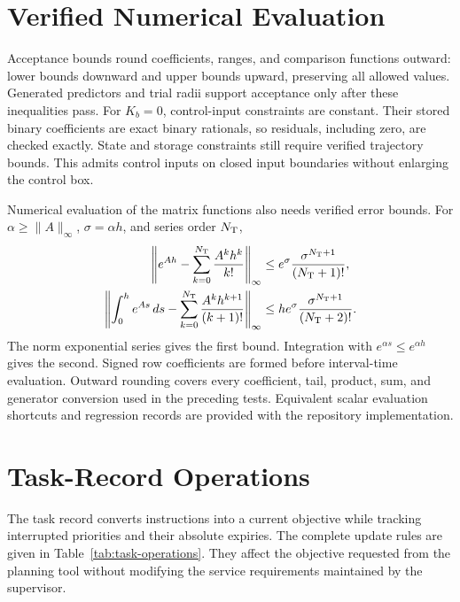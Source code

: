 \documentclass[preprint,12pt]{elsarticle}
\theoremstyle{definition}
\theoremstyle{plain}
\theoremstyle{definition}
\theoremstyle{plain}
\begin{document}
\section{Verified Numerical Evaluation}
\label{app:verified-arithmetic}

Acceptance bounds round coefficients, ranges, and comparison functions
outward: lower bounds downward and upper bounds upward, preserving all
allowed values. Generated predictors and trial radii support acceptance
only after these inequalities pass. For $K_b=0$, control-input constraints
are constant. Their stored binary coefficients are exact binary rationals,
so residuals, including zero, are checked exactly. State and storage
constraints still require verified trajectory bounds. This admits control inputs
on closed input boundaries without enlarging the control box.

Numerical evaluation of the matrix functions also needs verified error
bounds. For $\alpha\ge\|A\|_\infty$, $\sigma=\alpha h$, and series order $N_{\rm T}$,
\begin{equation}
 \begin{aligned}
 \left\|e^{Ah}-\sum_{k=0}^{N_{\rm T}}\frac{A^kh^k}{k!}\right\|_\infty
       &\le e^\sigma\frac{\sigma^{N_{\rm T}+1}}{(N_{\rm T}+1)!},\\
 \left\|\int_0^h e^{As}\,ds-
          \sum_{k=0}^{N_{\rm T}}\frac{A^kh^{k+1}}{(k+1)!}\right\|_\infty
       &\le he^\sigma\frac{\sigma^{N_{\rm T}+1}}{(N_{\rm T}+2)!}.
 \end{aligned}
 \label{eq:structure-matrix-tails}
\end{equation}
The norm exponential series gives the first bound. Integration with
$e^{\alpha s}\le e^{\alpha h}$ gives the second. Signed row coefficients
are formed before interval-time evaluation. Outward rounding covers every
coefficient, tail, product, sum, and generator conversion used in the
preceding tests. Equivalent scalar evaluation shortcuts and regression
records are provided with the repository implementation.

\section{Task-Record Operations}
\label{app:task-operations}

The task record converts instructions into a current objective while
tracking interrupted priorities and their absolute expiries. The complete
update rules are given in Table~\ref{tab:task-operations}. They affect the
objective requested from the planning tool without modifying the service
requirements maintained by the supervisor.
\end{document}
